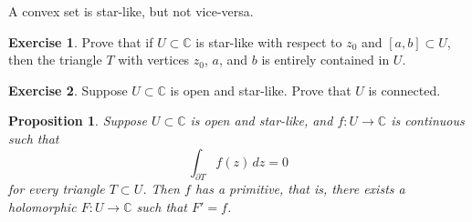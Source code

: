 \documentclass[12pt,openany]{book}
\newcommand{\C}{{\mathbb{C}}}
\theoremstyle{plain}
\newtheorem{prop}[thm]{Proposition}
\theoremstyle{remark}
\theoremstyle{definition}
\newenvironment{exbox}{%
    \def\FrameCommand{\vrule width 1pt \relax\hspace{10pt}}%
    \MakeFramed{\advance\hsize-\width\FrameRestore}%
}{%
    \endMakeFramed
}
\theoremstyle{exercise}
\newtheorem{exercise}{Exercise}[section]
\theoremstyle{example}
\begin{document}
A convex set is star-like, but not vice-versa.

\begin{exbox}
\begin{exercise} \label{exercise:triangleinstarlike}
Prove that if $U \subset \C$ is star-like with respect to $z_0$ and $[a,b]
\subset U$, then the triangle $T$ with vertices $z_0$, $a$, and $b$ is entirely
contained in $U$.
\end{exercise}

\begin{exercise}
Suppose $U \subset \C$ is open and star-like.  Prove that $U$ is connected.
\end{exercise}
\end{exbox}

\begin{prop} \label{prop:primitiveinstarlike1}
Suppose $U \subset \C$ is open and star-like,
and $f \colon U \to \C$ is continuous such that
\begin{equation*}
\int_{\partial T} f(z) \, dz = 0
\end{equation*}
for every triangle $T \subset U$.
Then $f$ has a primitive, that is,
there exists a holomorphic $F \colon U \to \C$
such that $F' = f$.
\end{prop}
\end{document}
